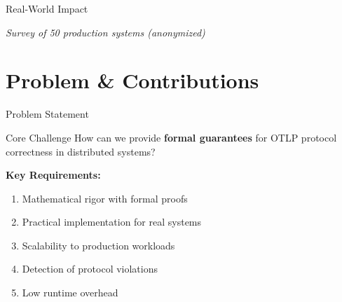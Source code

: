 \documentclass[aspectratio=169,xcolor=dvipsnames]{beamer}
\begin{document}
\begin{frame}{Real-World Impact}
\begin{center}
\end{center}
\footnotesize\textit{Survey of 50 production systems (anonymized)}
\end{frame}

\section{Problem \& Contributions}

\begin{frame}{Problem Statement}
\begin{block}{Core Challenge}
How can we provide \textbf{formal guarantees} for OTLP protocol correctness in distributed systems?
\end{block}

\vspace{1em}
\textbf{Key Requirements:}
\begin{enumerate}
    \item Mathematical rigor with formal proofs
    \item Practical implementation for real systems
    \item Scalability to production workloads
    \item Detection of protocol violations
    \item Low runtime overhead
\end{enumerate}
\end{frame}
\end{document}
